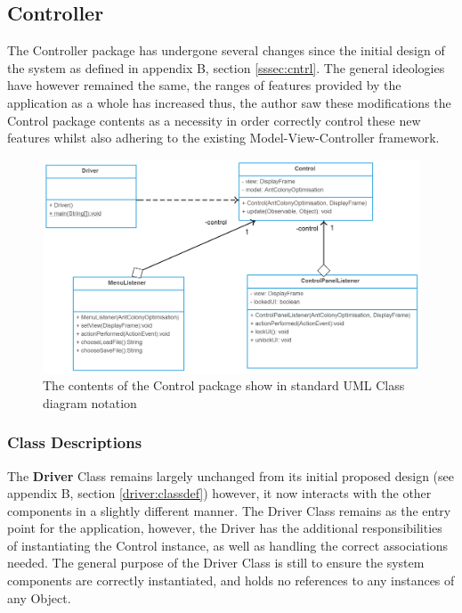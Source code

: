 \subsection{Controller}

The Controller package has undergone several changes since the initial design of the system as defined in appendix B, section \ref{sssec:cntrl}. The general ideologies have however remained the same, the ranges of features provided by the application as a whole has increased thus, the author saw these modifications the Control package contents as a necessity in order correctly control these new features whilst also adhering to the existing Model-View-Controller framework.

\begin{figure}[H]
\centering
\includegraphics[scale=0.23]{Images/chapter4/controller}
\caption{The contents of the Control package show in standard UML Class diagram notation}
\label{fig:controllerImp}
\end{figure}

\subsubsection{Class Descriptions}

The \textbf{Driver} Class remains largely unchanged from its initial proposed design (see appendix B, section \ref{driver:classdef}) however, it now interacts with the other components in a slightly different manner. The Driver Class remains as the entry point for the application, however, the Driver has the additional responsibilities of instantiating the Control instance, as well as handling the correct associations needed. The general purpose of the Driver Class is still to ensure the system components are correctly instantiated, and holds no references to any instances of any Object.

